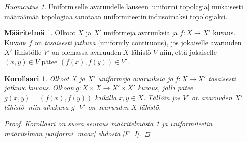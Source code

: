 \documentclass[12pt,a4paper,leqno]{report}
\theoremstyle{plain}
\newtheorem{kor}[equation]{Korollaari}
\theoremstyle{definition}
\newtheorem{maar}[equation]{Määritelmä}
\theoremstyle{remark}
\newtheorem{huom}[equation]{Huomautus}
\begin{document}
\begin{huom}\label{unif_indusoitu_topo}
Uniformiselle avaruudelle lauseen \ref{uniformi topologia} mukaisesti määräämää topologiaa sanotaan uniformiteetin indusoimaksi topologiaksi.
\end{huom}
\begin{maar}\label{tasaisesti_jatkuva}
Olkoot $X$ ja $X'$ uniformeja avaruuksia 
ja $f\colon X\rightarrow X'$ kuvaus.
Kuvaus $f$ on \emph{tasaisesti jatkuva} (uniformly continuous), jos jokaiselle avaruuden $X'$ lähistölle $V'$ on olemassa avaruuden $X$ lähistö $V$ niin, että jokaiselle $(x,y)\in V$ pätee $(f(x),f(y))\in V'$. 
\end{maar}
\begin{kor}\label{uniformi alkukuva}
Olkoot $X$ ja $X'$ uniformeja avaruuksia 
ja $f\colon X\rightarrow X'$ tasaisesti jatkuva kuvaus. 
Olkoon $g\colon X\times X\rightarrow X'\times X'$ %
kuvaus, jolla pätee $g(x,y)=(f(x),f(y))$ kaikilla $x,y\in X$. 
Tällöin jos $V'$ on avaruuden $X'$ lähistö, niin alkukuva $g^{\leftarrow}V'$ on avaruuden $X$ lähistö.
\begin{proof}
Korollaari on suora seuraus määritelmästä \ref{tasaisesti_jatkuva} ja uniformiteetin määritelmän \ref{uniformi_maar} ehdosta \ref{F_I}.
\end{proof}
\end{kor}
\end{document}
